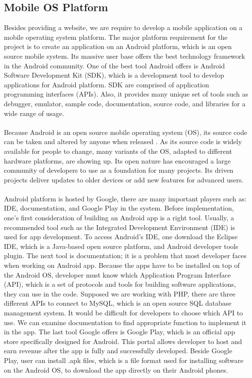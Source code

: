 \documentclass[letterpaper,10pt, draftclsnofoot,onecolumn]{IEEEtran}
\begin{document}
{{\subsection[Mobile OS Platform]{\noindent\color{black}
Mobile OS Platform}
{\noindent\color{black}
Besides providing a website, we are require to develop a mobile application on a mobile operating system platform.
The major platform requirement for the project is to create an application on an Android platform, which is an open source mobile system. 
Its massive user base offers the best technology framework in the Android community.
One of the best tool Android offers is Android Software Development Kit (SDK), 
which is a development tool to develop applications for Android platform. SDK are comprised of application programming interfaces (APIs).
Also, it provides many unique set of tools such as debugger, emulator, sample code, documentation, source code, and libraries for a wide range of usage.   
\\	\\
\noindent Because Android is an open source mobile operating system (OS), its source code can be taken and altered by anyone when released \cite{website3}. 
As its source code is widely available for people to change, many variants of the OS, adapted to different hardware platforms, are showing up. 
Its open nature has encouraged a large community of developers to use as a foundation for many projects.
Its driven projects deliver updates to older devices or add new features for advanced users.
\\	\\
\noindent Android platform is hosted by Google, there are many important players such as: IDE, documentation, and Google Play in the system. 
Before implementation, one’s first consideration of building an Android app is a right tool. Usually, a recommended tool such as the Integrated Development Environment (IDE) is used for app development.
To access Android’s IDE, one download the Eclipse IDE, which is a Java-based open source platform, and Android developer tools plugin. 
The next tool is documentation; it is a problem that most developer faces when working on Android app.
Because the apps have to be installed on top of the Android OS, developer must know which Application Program Interface (API), which is a set of protocols and tools for building software applications, they can use in the code. 
Supposed we are working with PHP, there are three different APIs to connect to MySQL, which is an open source SQL database management system. 
It would be difficult for developers to choose which API to use.
We can examine documentation to find appropriate function to implement it in the app. 
The last tool Google offers is Google Play, which is an official app store specifically designed for Android. 
This portal allows developer to host and earn revenue after the app is fully and successfully developed.
Beside Google Play, user can install .apk files, which is a file format used for installing software on the Android OS, to download the app directly on their Android phones.
}

}}
\end{document}
